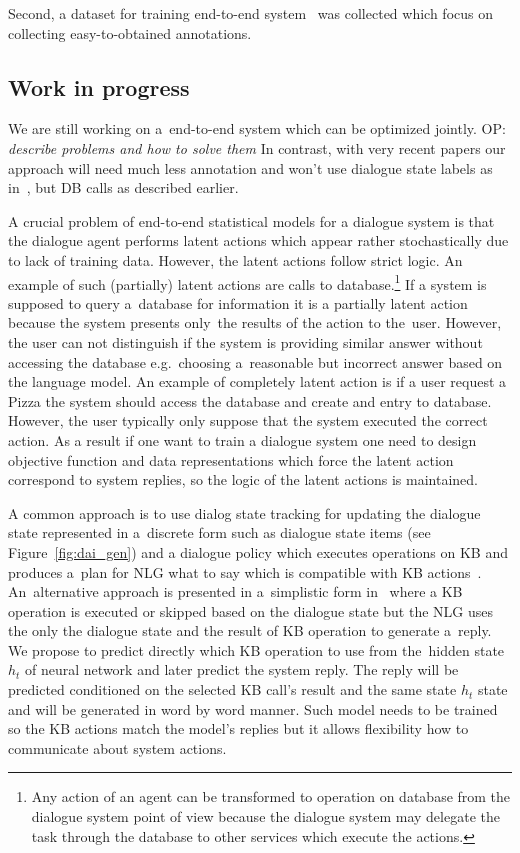 \documentclass[11pt]{article}
\def\OP#1{{\color{purple}OP: \it #1}}
\begin{document}
Second, a dataset for training end-to-end system~\cite{platek2016wochat} was collected which focus on collecting easy-to-obtained annotations.

\subsection{Work in progress}
We are still working on a~end-to-end system which can be optimized jointly.
\OP{describe problems and how to solve them}
In contrast, with very recent papers our approach will need much less annotation and won't use dialogue state labels as in~\cite{wen_networkbased_2016}, but DB calls as described earlier.

A crucial problem of end-to-end statistical models for a dialogue system is that the dialogue agent performs latent actions which appear rather stochastically due to lack of training data.
However, the latent actions follow strict logic.
An example of such (partially) latent actions are calls to database.\footnote{Any action of an agent can be transformed to operation on database from the dialogue system point of view because the dialogue system may delegate the task through the database to other services which execute the actions.}
If a system is supposed to query a~database for information it is a partially latent action because the system presents only~the results of the action to the~user.
However, the user can not distinguish if the system is providing similar answer without accessing the database e.g.~choosing a~reasonable but incorrect answer based on the language model.
An example of completely latent action is if a user request a Pizza the system should access the database and create and entry to database.
However, the user typically only suppose that the system executed the correct action.
As a result if one want to train a dialogue system one need to design objective function and data representations which force the latent action correspond to system replies, so the logic of the latent actions is maintained.

A common approach is to use dialog state tracking for updating the dialogue state represented in a~discrete form such as dialogue state items (see Figure~\ref{fig:dai_gen}) and a dialogue policy which executes operations on KB and produces a~plan for NLG what to say which is compatible with KB actions~\cite{dusek_sequence2sequence_2016,young2010hidden}.
An~alternative approach is presented in a~simplistic form in~\cite{wen_networkbased_2016} where a KB operation is executed or skipped based on the dialogue state but the NLG uses the only the dialogue state and the result of KB operation to generate a~reply.
We propose to predict directly which KB operation to use from the~hidden state $h_t$ of neural network and later predict the system reply.
The reply will be predicted conditioned on the selected KB call's result and the same state $h_t$ state and will be generated in word by word manner.
Such model needs to be trained so the KB actions match the model's replies but it allows flexibility how to communicate about system actions.
\end{document}
